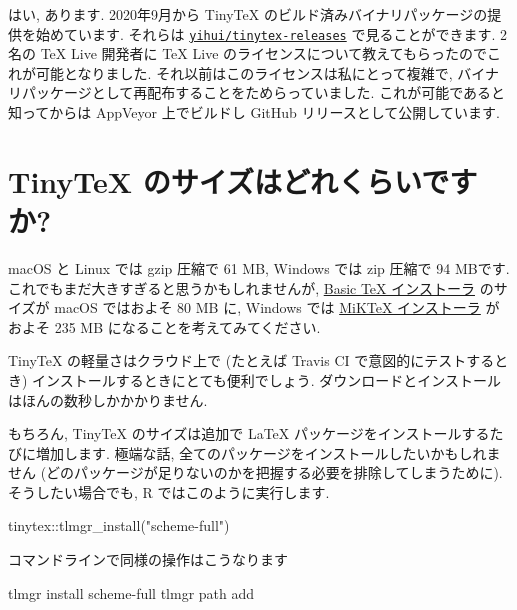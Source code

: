 \documentclass[
  xelatex,ja=standard,jafont=noto]{bxjsreport}
\newenvironment{Shaded}{\begin{snugshade}}{\end{snugshade}}
\newcommand{\ExtensionTok}[1]{#1}
\newcommand{\FunctionTok}[1]{\textcolor[rgb]{0.00,0.00,0.00}{#1}}
\newcommand{\NormalTok}[1]{#1}
\newcommand{\SpecialCharTok}[1]{\textcolor[rgb]{0.00,0.00,0.00}{#1}}
\newcommand{\StringTok}[1]{\textcolor[rgb]{0.31,0.60,0.02}{#1}}
\begin{document}
はい, あります. 2020年9月から TinyTeX
のビルド済みバイナリパッケージの提供を始めています. それらは
\href{https://github.com/yihui/tinytex-releases}{\texttt{yihui/tinytex-releases}}
で見ることができます. 2名の TeX Live 開発者に TeX Live
のライセンスについて教えてもらったのでこれが可能となりました.
それ以前はこのライセンスは私にとって複雑で,
バイナリパッケージとして再配布することをためらっていました.
これが可能であると知ってからは AppVeyor 上でビルドし GitHub
リリースとして公開しています.

\hypertarget{faq-tinytex-size}{%
\section{TinyTeX のサイズはどれくらいですか?}\label{faq-tinytex-size}}

macOS と Linux では gzip 圧縮で 61 MB, Windows では zip 圧縮で 94
MBです. これでもまだ大きすぎると思うかもしれませんが,
\href{https://www.tug.org/mactex/morepackages.html}{Basic TeX
インストーラ} のサイズが macOS ではおよそ 80 MB に, Windows では
\href{https://miktex.org/download}{MiKTeX インストーラ} がおよそ 235 MB
になることを考えてみてください.

TinyTeX の軽量さはクラウド上で (たとえば Travis CI
で意図的にテストするとき) インストールするときにとても便利でしょう.
ダウンロードとインストールはほんの数秒しかかかりません.

もちろん, TinyTeX のサイズは追加で LaTeX
パッケージをインストールするたびに増加します. 極端な話,
全てのパッケージをインストールしたいかもしれません
(どのパッケージが足りないのかを把握する必要を排除してしまうために).
そうしたい場合でも, R ではこのように実行します.

\begin{Shaded}
\begin{Highlighting}[numbers=left,,]
\NormalTok{tinytex}\SpecialCharTok{::}\FunctionTok{tlmgr\_install}\NormalTok{(}\StringTok{"scheme{-}full"}\NormalTok{)}
\end{Highlighting}
\end{Shaded}

コマンドラインで同様の操作はこうなります

\begin{Shaded}
\begin{Highlighting}[]
\ExtensionTok{tlmgr}\NormalTok{ install scheme{-}full}
\ExtensionTok{tlmgr}\NormalTok{ path add}
\end{Highlighting}
\end{Shaded}
\end{document}
